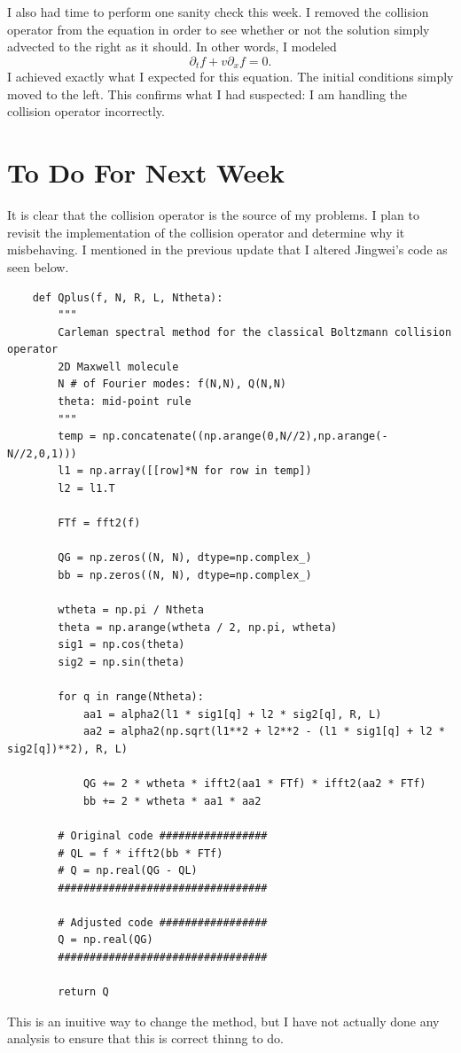 \documentclass{article}
\begin{document}
I also had time to perform one sanity check this week. I removed the collision operator from the equation in order to see whether or not the solution simply advected to the right as it should. In other words, I modeled
\[
    \partial_t f + v \partial_x f = 0.
\]
I achieved exactly what I expected for this equation. The initial conditions simply moved to the left. This confirms what I had suspected: I am handling the collision operator incorrectly.
\section{To Do For Next Week}
It is clear that the collision operator is the source of my problems. I plan to revisit the implementation of the collision operator and determine why it misbehaving. I mentioned in the previous update that I altered Jingwei's code as seen below. 
\bigskip
\begin{lstlisting}
    def Qplus(f, N, R, L, Ntheta):
        """
        Carleman spectral method for the classical Boltzmann collision operator
        2D Maxwell molecule
        N # of Fourier modes: f(N,N), Q(N,N)
        theta: mid-point rule
        """
        temp = np.concatenate((np.arange(0,N//2),np.arange(-N//2,0,1)))
        l1 = np.array([[row]*N for row in temp])
        l2 = l1.T
        
        FTf = fft2(f)
    
        QG = np.zeros((N, N), dtype=np.complex_)
        bb = np.zeros((N, N), dtype=np.complex_)
    
        wtheta = np.pi / Ntheta
        theta = np.arange(wtheta / 2, np.pi, wtheta)
        sig1 = np.cos(theta)
        sig2 = np.sin(theta)
    
        for q in range(Ntheta):
            aa1 = alpha2(l1 * sig1[q] + l2 * sig2[q], R, L)
            aa2 = alpha2(np.sqrt(l1**2 + l2**2 - (l1 * sig1[q] + l2 * sig2[q])**2), R, L)
    
            QG += 2 * wtheta * ifft2(aa1 * FTf) * ifft2(aa2 * FTf)
            bb += 2 * wtheta * aa1 * aa2
    
        # Original code #################
        # QL = f * ifft2(bb * FTf)
        # Q = np.real(QG - QL)
        #################################
    
        # Adjusted code #################
        Q = np.real(QG)
        #################################
    
        return Q
    \end{lstlisting}
\bigskip
This is an inuitive way to change the method, but I have not actually done any analysis to ensure that this is correct thinng to do.
\end{document}

